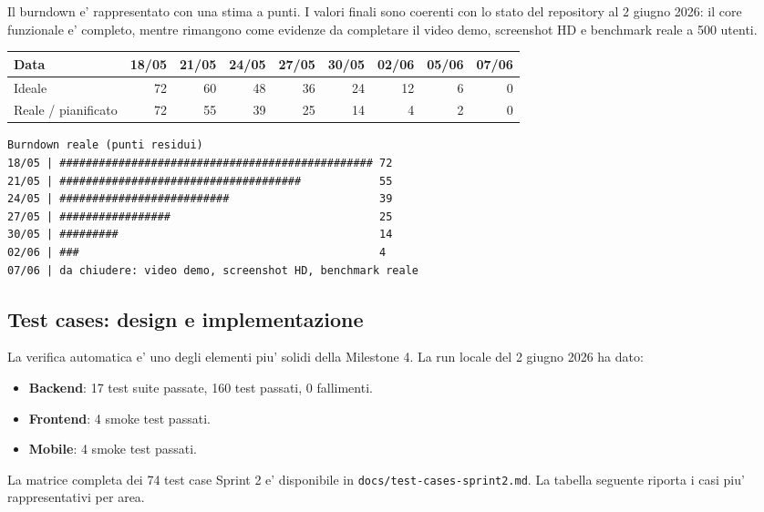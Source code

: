 \documentclass[11pt,a4paper]{article}
\newcommand{\code}[1]{\texttt{#1}}
\begin{document}
Il burndown e' rappresentato con una stima a punti. I valori finali sono coerenti
con lo stato del repository al 2 giugno 2026: il core funzionale e' completo, mentre
rimangono come evidenze da completare il video demo, screenshot HD e benchmark reale
a 500 utenti.

\begin{center}
\begin{tabular}{lrrrrrrrr}
\toprule
\textbf{Data} & 18/05 & 21/05 & 24/05 & 27/05 & 30/05 & 02/06 & 05/06 & 07/06 \\
\midrule
Ideale & 72 & 60 & 48 & 36 & 24 & 12 & 6 & 0 \\
Reale / pianificato & 72 & 55 & 39 & 25 & 14 & 4 & 2 & 0 \\
\bottomrule
\end{tabular}
\end{center}

\begin{lstlisting}[style=plaincode]
Burndown reale (punti residui)
18/05 | ################################################ 72
21/05 | #####################################            55
24/05 | ##########################                       39
27/05 | #################                                25
30/05 | #########                                        14
02/06 | ###                                              4
07/06 | da chiudere: video demo, screenshot HD, benchmark reale
\end{lstlisting}

\subsection{Test cases: design e implementazione}

La verifica automatica e' uno degli elementi piu' solidi della Milestone 4. La run
locale del 2 giugno 2026 ha dato:

\begin{itemize}
  \item \textbf{Backend}: 17 test suite passate, 160 test passati, 0 fallimenti.
  \item \textbf{Frontend}: 4 smoke test passati.
  \item \textbf{Mobile}: 4 smoke test passati.
\end{itemize}

La matrice completa dei 74 test case Sprint 2 e' disponibile in
\code{docs/test-cases-sprint2.md}. La tabella seguente riporta i casi piu'
rappresentativi per area.
\end{document}
